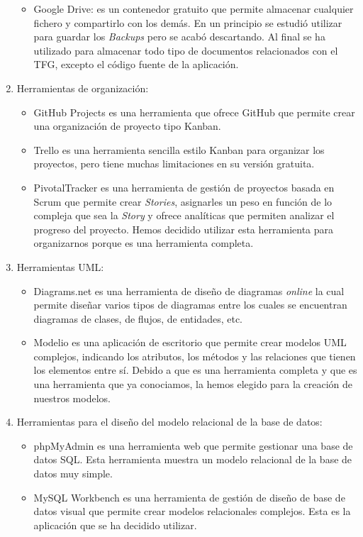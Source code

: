 \documentclass[11pt]{book}
\begin{document}
\begin{enumerate}
\begin{itemize}
			\item Google Drive: es un contenedor gratuito que permite almacenar cualquier fichero y compartirlo con los demás. En un principio se estudió utilizar para guardar los \textit{Backups} pero se acabó descartando. Al final se ha utilizado para almacenar todo tipo de documentos relacionados con el TFG, excepto el código fuente de la aplicación.
		\end{itemize}
		\item Herramientas de organización: 
		\begin{itemize} 
			\item GitHub Projects es una herramienta que ofrece GitHub que permite crear una organización de proyecto tipo Kanban.
			\item Trello es una herramienta sencilla estilo Kanban para organizar los proyectos, pero tiene muchas limitaciones en su versión gratuita.
			\item PivotalTracker es una herramienta de gestión de proyectos basada en Scrum que permite crear \textit{Stories}, asignarles un peso en función de lo compleja que sea la \textit{Story} y ofrece analíticas que permiten analizar el progreso del proyecto. Hemos decidido utilizar esta herramienta para organizarnos porque es una herramienta completa.
		\end{itemize}
		\item Herramientas UML: 
		\begin{itemize} 
			\item Diagrams.net es una herramienta de diseño de diagramas \textit{online} la cual permite diseñar varios tipos de diagramas entre los cuales se encuentran diagramas de clases, de flujos, de entidades, etc.
			\item Modelio es una aplicación de escritorio que permite crear modelos UML complejos, indicando los atributos, los métodos y las relaciones que tienen los elementos entre sí. Debido a que es una herramienta completa y que es una herramienta que ya conociamos, la hemos elegido para la creación de nuestros modelos.
		\end{itemize}
		\item Herramientas para el diseño del modelo relacional de la base de datos: 
		\begin{itemize} 
			\item phpMyAdmin es una herramienta web que permite gestionar una base de datos SQL. Esta herramienta muestra un modelo relacional de la base de datos muy simple.
			\item MySQL Workbench es una herramienta de gestión de diseño de base de datos visual que permite crear modelos relacionales complejos. Esta es la aplicación que se ha decidido utilizar.

\end{itemize}
\end{enumerate}
\end{document}
